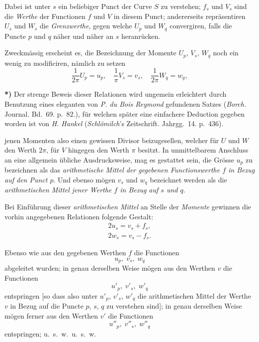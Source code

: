 \documentclass{article}
\begin{document}
Dabei ist unter $s$ ein beliebiger Punct der Curve $S$ zu verstehen; $f_{s}$ und $V_{s}$ sind die \emph{Werthe} der Functionen $f$ und $V$ in diesem Punct; andererseits repräsentiren $U_{s}$ und $W_{s}$ die \emph{Grenzwerthe}, gegen welche $U_{p}$ und $W_{q}$ convergiren, falls die Puncte $p$ und $q$ näher und näher an $s$ heranrücken.

Zweckmässig erscheint es, die Bezeichnung der Momente $U_{p}$, $V_{s}$, $W_{q}$ noch ein wenig zu modificiren, nämlich zu setzen
\[
\frac{1}{2\pi}U_{p}=u_{p}, \quad \frac{1}{\pi}V_{s}=v_{s}, \quad \frac{1}{2\pi}W_{q}=w_{q},
\]

\textbf{*)} Der strenge Beweis dieser Relationen wird ungemein erleichtert durch Benutzung eines eleganten von \emph{P. du Bois Reymond} gefundenen Satzes (\emph{Borch.} Journal. Bd.\ 69. p.\ 82.), für welchen später eine einfachere Deduction gegeben worden ist von \emph{H. Hankel} (\emph{Schlömilch}'s Zeitschrift. Jahrgg.\ 14. p.\ 436).

jenen Momenten also einen gewissen Divisor beizugesellen, welcher für $U$ und $W$ den Werth $2\pi$, für $V$ hingegen den Werth $\pi$ besitzt. In unmittelbarem Anschluss an eine allgemein übliche Ausdrucksweise, mag es gestattet sein, die Grösse $u_{p}$ zu bezeichnen als das \emph{arithmetische Mittel der gegebenen Functionswerthe $f$ in Bezug auf den Punct $p$}. Und ebenso mögen $v_{s}$ und $w_{q}$ bezeichnet werden als die \emph{arithmetischen Mittel jener Werthe $f$ in Bezug auf $s$ und $q$}.

Bei Einführung dieser \emph{arithmetischen Mittel} an Stelle der \emph{Momente} gewinnen die vorhin angegebenen Relationen folgende Gestalt:
\[
\begin{gathered}
2u_{s}=v_{s}+f_{s},\\
2w_{s}=v_{s}-f_{s}.
\end{gathered}
\]

Ebenso wie aus den gegebenen Werthen $f$ die Functionen
\[
u_{p},\; v_{s},\; w_{q}
\]
abgeleitet wurden; in genau derselben Weise mögen aus den Werthen $v$ die Functionen
\[
u'_{p},\; v'_{s},\; w'_{q}
\]
entspringen [so dass also unter $u'_{p}$, $v'_{s}$, $w'_{q}$ die arithmetischen Mittel der Werthe $v$ in Bezug auf die Puncte $p$, $s$, $q$ zu verstehen sind]; in genau derselben Weise mögen ferner aus den Werthen $v'$ die Functionen
\[
u''_{p},\; v''_{s},\; w''_{q}
\]
entspringen; u.\ s.\ w.\ u.\ s.\ w.
\end{document}

